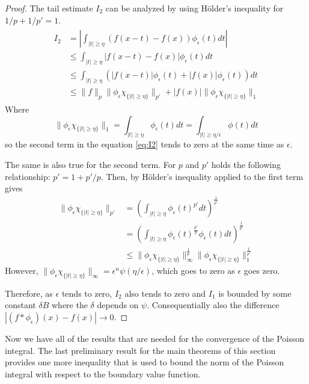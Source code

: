 \begin{proof}
    The tail estimate $I_2$ can be analyzed by using Hölder's inequality for $1/p+1/p'=1$.
    \begin{align}\label{eq:I2}
        \begin{split}
            I_2&=\left|\int_{|t|\geq\eta}(f(x-t)-f(x))\phi_\epsilon(t)dt \right| \\
            &\leq\int_{|t|\geq\eta}|f(x-t)-f(x)|\phi_\epsilon(t)dt \\
            &\leq\int_{|t|\geq\eta}(|f(x-t)|\phi_\epsilon(t)+|f(x)|\phi_\epsilon(t))dt \\
            &\leq\|f\|_p\|\phi_\epsilon\chi_{\{|t|\geq\eta\}}\|_{p'}+|f(x)|\|\phi_\epsilon\chi_{\{|t|\geq\eta\}}\|_{1}
        \end{split}
    \end{align}
    Where
    \begin{equation*}
        \|\phi_\epsilon\chi_{\{|t|\geq\eta\}}\|_{1}=\int_{|t|\geq\eta}\phi_\epsilon(t)dt=\int_{|t|\geq\eta/\epsilon}\phi(t)dt
    \end{equation*}
    so the second term in the equation \ref{eq:I2} tends to zero at the same time as $\epsilon$. 
    
    The same is also true for the second term. For $p$ and $p'$ holds the following relationship: $p'=1+p'/p$. Then, by Hölder's inequality applied to the first term gives
    \begin{align*}
        \|\phi_\epsilon\chi_{\{|t|\geq\eta\}}\|_{p'}&=\left(\int_{|t|\geq\eta}\phi_\epsilon(t)^{p'}dt \right)^{\frac{1}{p'}} \\
        &=\left(\int_{|t|\geq\eta}\phi_\epsilon(t)^{\frac{p'}{p}}\phi_\epsilon(t) dt \right)^{\frac{1}{p'}} \\
        &\leq\|\phi_\epsilon\chi_{\{|t|\geq\eta\}}\|_{\infty}^{\frac{1}{p}}\|\phi_\epsilon\chi_{\{|t|\geq\eta\}}\|_{1}^{\frac{1}{p'}}
    \end{align*}
    However, $\|\phi_\epsilon\chi_{\{|t|\geq\eta\}}\|_\infty=\epsilon^{n}\psi(\eta/\epsilon)$, which goes to zero as $\epsilon$ goes zero. 
    
    Therefore, as $\epsilon$ tends to zero, $I_2$ also tends to zero and $I_1$ is bounded by some constant $\delta B$ where the $\delta$ depends on $\psi$. Consequentially also the difference $|(f*\phi_\epsilon)(x)-f(x)|\rightarrow0$.
\end{proof}

Now we have all of the results that are needed for the convergence of the Poisson integral. The last preliminary result for the main theorems of this section provides one more inequality that is used to bound the norm of the Poisson integral with respect to the boundary value function.

